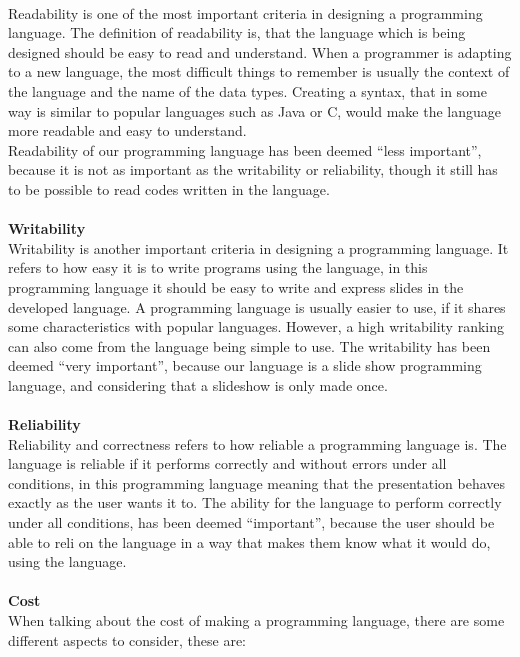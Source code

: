  \\
Readability is one of the most important criteria in designing a programming language. The definition of readability is, that the language which is being designed should be easy to read and understand. When a programmer is adapting to a new language, the most difficult things to remember is usually the context of the language and the name of the data types. Creating a syntax, that in some way is similar to popular languages such as Java or C, would make the language more readable and easy to understand. \\
Readability of our programming language has been deemed ``less important'', because it is not as important as the writability or reliability, though it still has to be possible to read codes written in the language.
\\ \\
\textbf{Writability} \\
Writability is another important criteria in designing a programming language. It refers to how easy it is to write programs using the language, in this programming language it should be easy to write and express slides in the developed language. A programming language is usually easier to use, if it shares some characteristics with popular languages. However, a high writability ranking can also come from the language being simple to use. The writability has been deemed ``very important'', because our language is a slide show programming language, and considering that a slideshow is only made once.
\\ \\
\textbf{Reliability} \\
Reliability and correctness refers to how reliable a programming language is. The language is reliable if it performs correctly and without errors under all conditions, in this programming language meaning that the presentation behaves exactly as the user wants it to. The ability for the language to perform correctly under all conditions, has been deemed ``important'', because the user should be able to reli on the language in a way that makes them know what it would do, using the language.
\\ \\
\textbf{Cost} \\
When talking about the cost of making a programming language, there are some different aspects to consider, these are:
